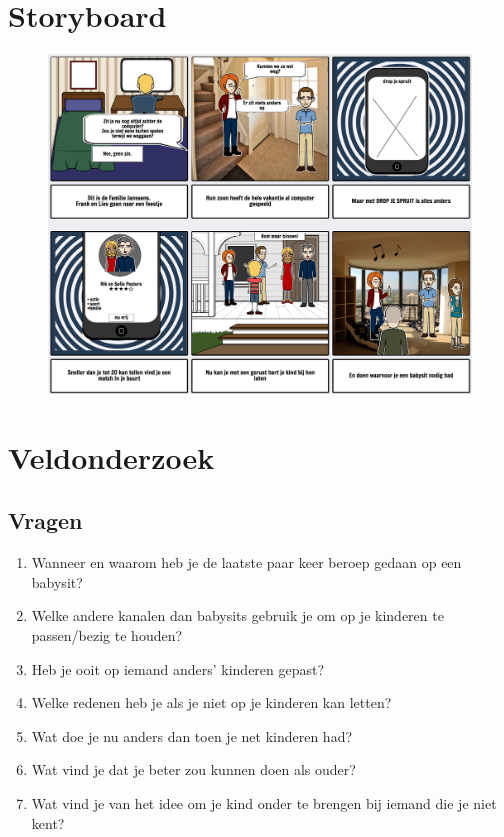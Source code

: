 \documentclass[a4paper,12pt]{article}
\begin{document}
\section{Storyboard}

\begin{figure}[H]
  \centering
  \includegraphics[width=\textwidth,keepaspectratio]{./storyboard.png}
\end{figure}

\section{Veldonderzoek}

\subsection{Vragen}
\begin{enumerate}
  \item Wanneer en waarom heb je de laatste paar keer beroep gedaan op een babysit?
  \item Welke andere kanalen dan babysits gebruik je om op je kinderen te passen/bezig te houden?
  \item Heb je ooit op iemand anders' kinderen gepast?
  \item Welke redenen heb je als je niet op je kinderen kan letten?
  \item Wat doe je nu anders dan toen je net kinderen had?
  \item Wat vind je dat je beter zou kunnen doen als ouder?
  \item Wat vind je van het idee om je kind onder te brengen bij iemand die je niet kent?
\end{enumerate}
\end{document}
